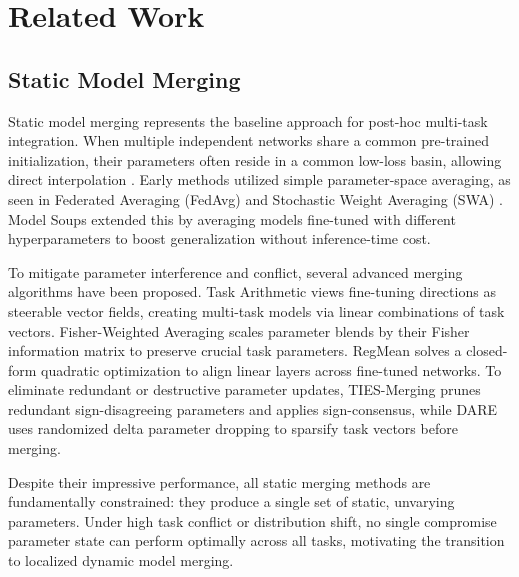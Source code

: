 \section{Related Work}
\label{sec:related}

\subsection{Static Model Merging}
Static model merging represents the baseline approach for post-hoc multi-task integration. When multiple independent networks share a common pre-trained initialization, their parameters often reside in a common low-loss basin, allowing direct interpolation \cite{ainsworth2022git}. Early methods utilized simple parameter-space averaging, as seen in Federated Averaging (FedAvg) \cite{mcmahan2017communication} and Stochastic Weight Averaging (SWA) \cite{izmailov2018averaging}. Model Soups \cite{wortsman2022model} extended this by averaging models fine-tuned with different hyperparameters to boost generalization without inference-time cost. 

To mitigate parameter interference and conflict, several advanced merging algorithms have been proposed. Task Arithmetic \cite{ilharco2022editing} views fine-tuning directions as steerable vector fields, creating multi-task models via linear combinations of task vectors. Fisher-Weighted Averaging \cite{matena2022merging} scales parameter blends by their Fisher information matrix to preserve crucial task parameters. RegMean \cite{jin2022dataless} solves a closed-form quadratic optimization to align linear layers across fine-tuned networks. To eliminate redundant or destructive parameter updates, TIES-Merging \cite{yadav2023ties} prunes redundant sign-disagreeing parameters and applies sign-consensus, while DARE \cite{yu2023language} uses randomized delta parameter dropping to sparsify task vectors before merging. 

Despite their impressive performance, all static merging methods are fundamentally constrained: they produce a single set of static, unvarying parameters. Under high task conflict or distribution shift, no single compromise parameter state can perform optimally across all tasks, motivating the transition to localized dynamic model merging.

